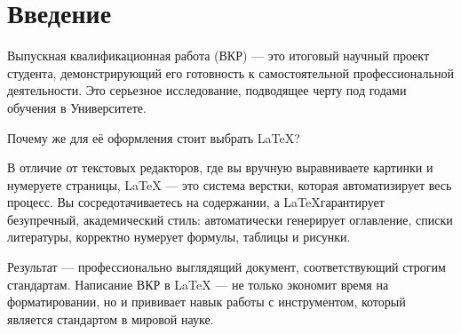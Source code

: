 {}

\section*{Введение}


Выпускная квалификационная работа (ВКР) — это итоговый научный проект студента, демонстрирующий его готовность к самостоятельной профессиональной деятельности. Это серьезное исследование, подводящее черту под годами обучения в Университете.

Почему же для её оформления стоит выбрать \LaTeX?

В отличие от текстовых редакторов, где вы вручную выравниваете картинки и нумеруете страницы, \LaTeX{} --- это система верстки, которая автоматизирует весь процесс. Вы сосредотачиваетесь на содержании, а \LaTeX гарантирует безупречный, академический стиль: автоматически генерирует оглавление, списки литературы, корректно нумерует формулы, таблицы и рисунки.

Результат — профессионально выглядящий документ, соответствующий строгим стандартам. Написание ВКР в \LaTeX{} ---  не только экономит время на форматировании, но и прививает навык работы с инструментом, который является стандартом в мировой науке.



%	
%	
%		
%		
%		
%	
%		
%	
%	



